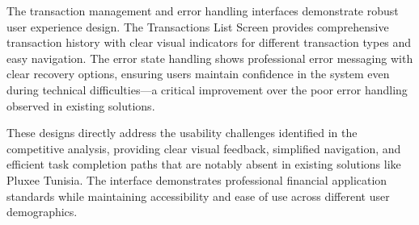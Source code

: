 The transaction management and error handling interfaces demonstrate robust user experience design. The Transactions List Screen provides comprehensive transaction history with clear visual indicators for different transaction types and easy navigation. The error state handling shows professional error messaging with clear recovery options, ensuring users maintain confidence in the system even during technical difficulties—a critical improvement over the poor error handling observed in existing solutions.

These designs directly address the usability challenges identified in the competitive analysis, providing clear visual feedback, simplified navigation, and efficient task completion paths that are notably absent in existing solutions like Pluxee Tunisia. The interface demonstrates professional financial application standards while maintaining accessibility and ease of use across different user demographics.